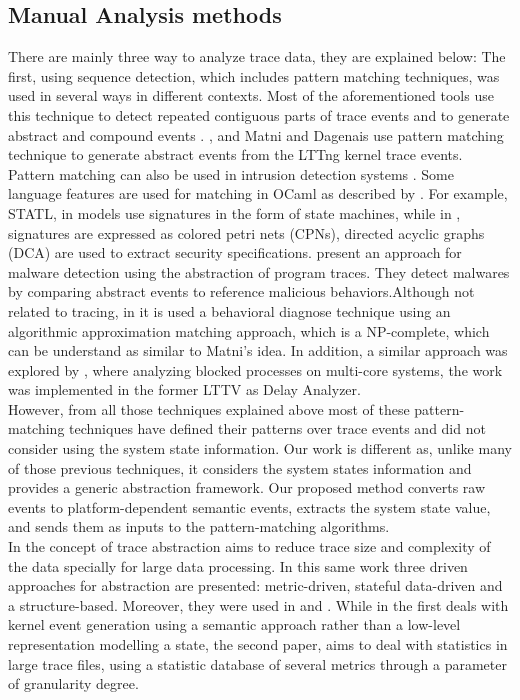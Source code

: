 \subsection{Manual Analysis methods}
There are mainly three way to analyze trace data, they are explained below:
The first, using sequence detection, which includes pattern matching techniques, was used in several ways in different contexts. Most of the aforementioned tools use this technique to detect repeated contiguous parts of trace events and to generate abstract and compound events \cite{Pinpoint}. \cite{Fadel}, and Matni and Dagenais \cite{matni} use pattern matching technique to generate abstract events from the LTTng kernel trace events. Pattern matching can also be used in intrusion detection systems \cite{pattern_matching_intrusion}. Some language features are used for matching in OCaml as described by \cite{ocaml}.
For example, STATL, in \cite{statl} models use signatures in the form of state machines, while in \cite{tracecompass}, signatures are expressed as colored petri nets (CPNs), directed acyclic graphs (DCA) are used to extract security specifications. \cite{behavior_abstraction} present an approach for malware detection using the abstraction of program traces. They detect malwares by comparing abstract events to reference malicious behaviors.Although not related to tracing, in \cite{Fredrikson2011} it is used a behavioral diagnose technique using an algorithmic approximation matching approach, which is a NP-complete, which can be understand as similar to Matni's idea. In addition, a similar approach was explored by \cite{Fournier}, where analyzing blocked processes on multi-core systems, the work was implemented in the former LTTV as Delay Analyzer.\\
However, from all those techniques explained above most of these pattern-matching techniques have defined their patterns over trace events and did not consider using the system state information. Our work is different as, unlike many of those previous techniques, it considers the system states information and provides a generic abstraction framework. Our proposed method converts raw events to platform-dependent semantic events, extracts the system state value, and sends them as inputs to the pattern-matching algorithms.\\
In \cite{naser_abstraction} the concept of trace abstraction aims to reduce trace size and complexity of the data specially for large data processing. In this same work three driven approaches for abstraction are presented: metric-driven, stateful data-driven and a structure-based. Moreover, they were used in \cite{trace_abstraction_1} and \cite{trace_abstraction_2}. While in the first deals with kernel event generation using a semantic approach rather than a low-level representation modelling a state, the second paper, aims to deal with statistics in large trace files, using a statistic database of several metrics through a parameter of granularity degree. \\
